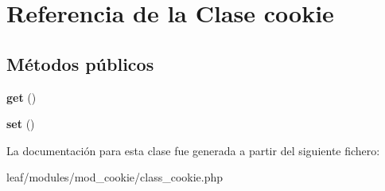\hypertarget{classcookie}{\section{Referencia de la Clase cookie}
\label{classcookie}
}
\subsection*{Métodos públicos}
\begin{DoxyCompactItemize}
\item 
\hypertarget{classcookie_ac33ee765f5ad9f134540bac393721cfe}{{\bfseries get} ()}\label{classcookie_ac33ee765f5ad9f134540bac393721cfe}

\item 
\hypertarget{classcookie_a89f017a6c12e98acec0d6833ea9c8994}{{\bfseries set} ()}\label{classcookie_a89f017a6c12e98acec0d6833ea9c8994}

\end{DoxyCompactItemize}


La documentación para esta clase fue generada a partir del siguiente fichero\-:\begin{DoxyCompactItemize}
\item 
leaf/modules/mod\-\_\-cookie/class\-\_\-cookie.\-php\end{DoxyCompactItemize}
